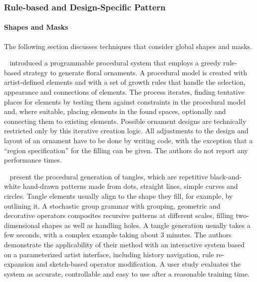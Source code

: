 

\subsubsection{Rule-based and Design-Specific Pattern}
\label{subsubsec:analysis_rulebased_and_designspecific}


\paragraph{Shapes and Masks}
\label{para:analysis_rulebased_shapes_and_masks}

The following section discusses techniques that consider global shapes and masks.


\citeauthor*{wong_1998_cgf}~\cite{wong_1998_cgf} introduced a programmable procedural system that employs a greedy rule-based strategy to generate floral ornaments. A procedural model is created with artist-defined elements and with a set of growth rules that handle the selection, appearance and connections of elements. The process iterates, finding tentative places for elements by testing them against constraints in the procedural model and, where suitable, placing elements in the found spaces, optionally and connecting them to existing elements. Possible ornament designs are technically restricted only by this iterative creation logic. All adjustments to the design and layout of an ornament have to be done by writing code, with the exception that a ``region specification'' for the filling can be given. The authors do not report any performance times.

\citeauthor*{santoni_2016_ggp}~\cite{santoni_2016_ggp} present the procedural generation of tangles, which are repetitive black-and-white hand-drawn patterns made from dots, straight lines, simple curves and circles. Tangle elements usually align to the shape they fill, for example, by outlining it. A stochastic group grammar with grouping, geometric and decorative operators composites recursive patterns at different scales, filling two-dimensional shapes as well as handling holes. A tangle generation usually takes a few seconds, with a complex example taking about 3 minutes. The authors demonstrate the applicability of their method with an interactive system based on a parameterized artist interface, including history navigation, rule re-expansion and sketch-based operator modification. A user study evaluates the system as accurate, controllable and easy to use after a reasonable training time.

